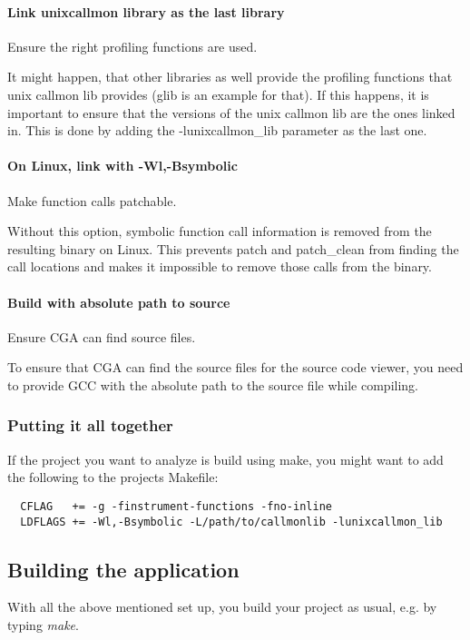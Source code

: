 \paragraph{Link unixcallmon library as the last library} Ensure the right profiling functions are used.

It might happen, that other libraries as well provide the profiling functions that unix callmon lib provides (glib is an example for that). If this happens, it is important to ensure that the versions of the unix callmon lib are the ones linked in. This is done by adding the -lunixcallmon\_lib parameter as the last one.

\paragraph{On Linux, link with -Wl,-Bsymbolic} Make function calls patchable.

Without this option, symbolic function call information is removed from the resulting binary on Linux. This prevents patch and patch\_clean from finding the call locations and makes it impossible to remove those calls from the binary. 

\paragraph{Build with absolute path to source} Ensure CGA can find source files.

To ensure that CGA can find the source files for the source code viewer, you need to provide GCC with the absolute path to the source file while compiling.

\subsubsection{Putting it all together} If the project you want to analyze is build using make, you might want to add the following to the projects Makefile:
\begin{verbatim}
  CFLAG   += -g -finstrument-functions -fno-inline 
  LDFLAGS += -Wl,-Bsymbolic -L/path/to/callmonlib -lunixcallmon_lib
\end{verbatim}

\subsection{Building the application} With all the above mentioned set up, you build your project as usual, e.g. by typing \emph{make}.


